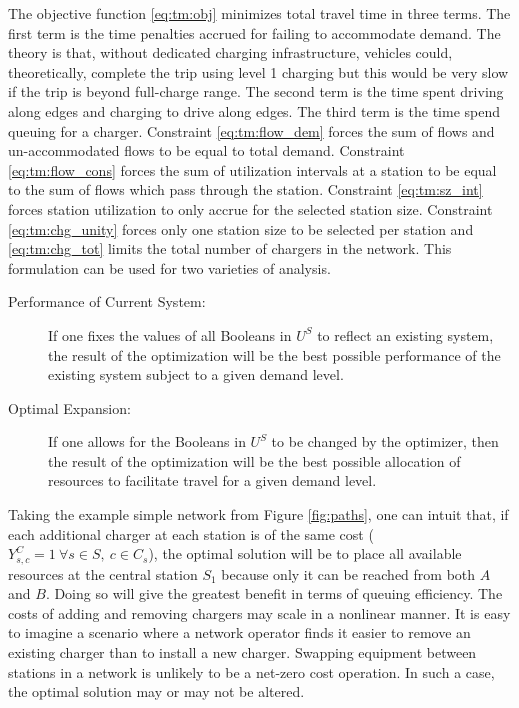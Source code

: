 The objective function \eqref{eq:tm:obj} minimizes total travel time in three terms. The first term is the time penalties accrued for failing to accommodate demand. The theory is that, without dedicated charging infrastructure, vehicles could, theoretically, complete the trip using level 1 charging but this would be very slow if the trip is beyond full-charge range. The second term is the time spent driving along edges and charging to drive along edges. The third term is the time spend queuing for a charger. Constraint \eqref{eq:tm:flow_dem} forces the sum of flows and un-accommodated flows to be equal to total demand. Constraint \eqref{eq:tm:flow_cons} forces the sum of utilization intervals at a station to be equal to the sum of flows which pass through the station. Constraint \eqref{eq:tm:sz_int} forces station utilization to only accrue for the selected station size. Constraint \eqref{eq:tm:chg_unity} forces only one station size to be selected per station and \eqref{eq:tm:chg_tot} limits the total number of chargers in the network. This formulation can be used for two varieties of analysis.

\begin{description}
	\item [Performance of Current System:] If one fixes the values of all Booleans in $U^S$ to reflect an existing system, the result of the optimization will be the best possible performance of the existing system subject to a given demand level.
	\item [Optimal Expansion:] If one allows for the Booleans in $U^S$ to be changed by the optimizer, then the result of the optimization will be the best possible allocation of resources to facilitate travel for a given demand level.
\end{description}

Taking the example simple network from Figure \ref{fig:paths}, one can intuit that, if each additional charger at each station is of the same cost ($Y^C_{s, c} = 1\ \forall s\in S,\ c\in C_s$), the optimal solution will be to place all available resources at the central station $S_1$ because only it can be reached from both $A$ and $B$. Doing so will give the greatest benefit in terms of queuing efficiency. The costs of adding and removing chargers may scale in a nonlinear manner. It is easy to imagine a scenario where a network operator finds it easier to remove an existing charger than to install a new charger. Swapping equipment between stations in a network is unlikely to be a net-zero cost operation. In such a case, the optimal solution may or may not be altered.